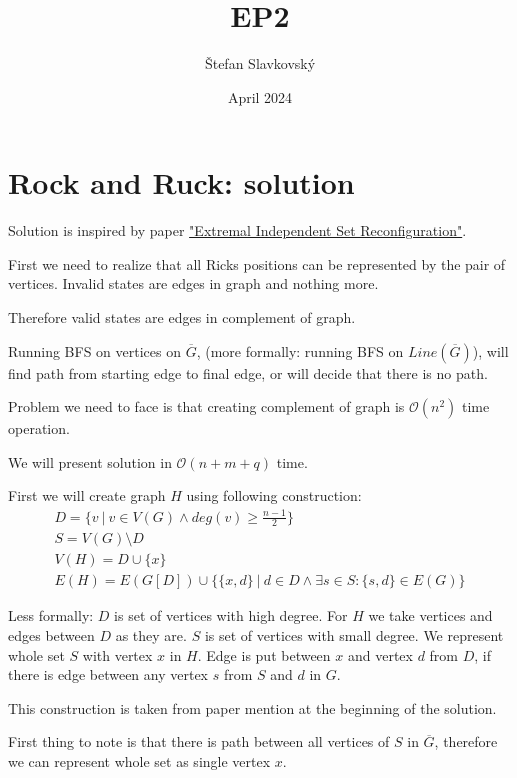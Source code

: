 \documentclass{article}
\title{EP2}
\author{Štefan Slavkovský}
\date{April 2024}
\begin{document}
\maketitle
{
    \centering
    \section*{Rock and Ruck: solution}
    \par
}

Solution is inspired by paper \href{https://www.combinatorics.org/ojs/index.php/eljc/article/download/v30i3p8/pdf/}{"Extremal Independent Set Reconfiguration"}.

First we need to realize that all Ricks positions
can be represented by the pair of vertices.
Invalid states are edges in graph and nothing more.

Therefore valid states are edges in complement
of graph.

Running BFS on vertices on $\overline{G}$, (more formally: running BFS on $Line(\overline{G})$), will
find path from starting edge to final edge, or will decide that there is no path.

Problem we need to face is that creating complement of graph is $\mathcal{O}(n^2)$ time operation.

We will present solution in $\mathcal{O}(n + m + q)$ time.

First we will create graph $H$ using following construction:
\begin{gather*}
    D = \{v~|~ v \in V(G) \land deg(v) \geqslant \frac{n-1}{2}\} \\
    S = V(G) \setminus D  \\
    V(H) = D \cup \{x\}  \\
    E(H) = E(G[D]) \cup \{\{x, d\}~|~d \in D \land \exists s \in S: \{s, d\} \in E(G)\}
\end{gather*}

Less formally: $D$ is set of vertices with high degree. For $H$ we take vertices and edges between $D$ as they are.
$S$ is set of vertices with small degree.
We represent whole set $S$ with vertex $x$ in $H$.
Edge is put between $x$ and vertex $d$ from $D$, if there
is edge between any vertex $s$ from $S$ and $d$ in $G$.

This construction is taken from paper mention at the beginning of the solution.

First thing to note is that there is path between all vertices of $S$ in $\overline{G}$, therefore we can represent whole set as single vertex $x$.
\end{document}
